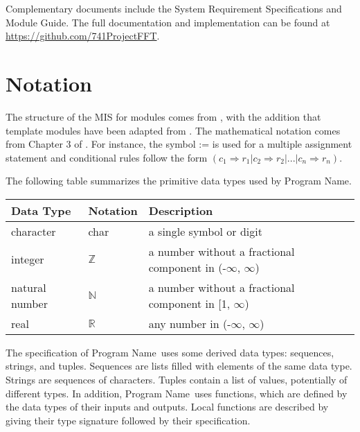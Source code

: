 \documentclass[12pt, titlepage]{article}
\newcommand{\progname}{Program Name}
\begin{document}

Complementary documents include the System Requirement Specifications
and Module Guide.  The full documentation and implementation can be
found at \url{https://github.com/741ProjectFFT}. 

\section{Notation}


The structure of the MIS for modules comes from \citet{HoffmanAndStrooper1995},
with the addition that template modules have been adapted from
\cite{GhezziEtAl2003}.  The mathematical notation comes from Chapter 3 of
\citet{HoffmanAndStrooper1995}.  For instance, the symbol := is used for a
multiple assignment statement and conditional rules follow the form $(c_1
\Rightarrow r_1 | c_2 \Rightarrow r_2 | ... | c_n \Rightarrow r_n )$.

The following table summarizes the primitive data types used by \progname. 

\begin{center}
\renewcommand{\arraystretch}{1.2}
\noindent 
\begin{tabular}{l l p{7.5cm}} 
\toprule 
\textbf{Data Type} & \textbf{Notation} & \textbf{Description}\\ 
\midrule
character & char & a single symbol or digit\\
integer & $\mathbb{Z}$ & a number without a fractional component in (-$\infty$, $\infty$) \\
natural number & $\mathbb{N}$ & a number without a fractional component in [1, $\infty$) \\
real & $\mathbb{R}$ & any number in (-$\infty$, $\infty$)\\
\bottomrule
\end{tabular} 
\end{center}


\noindent
The specification of \progname \ uses some derived data types: sequences, strings, and
tuples. Sequences are lists filled with elements of the same data type. Strings
are sequences of characters. Tuples contain a list of values, potentially of
different types. In addition, \progname \ uses functions, which
are defined by the data types of their inputs and outputs. Local functions are
described by giving their type signature followed by their specification.
\end{document}
